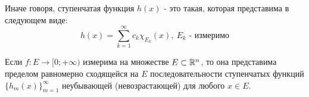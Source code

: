 \begin{note}
	Иначе говоря, ступенчатая функция $h(x)$ - это такая, которая представима в следующем виде:
	\[
		h(x) = \sum_{k = 1}^\infty c_k \chi_{E_k}(x),\ E_k \text{ - измеримо}
	\]
\end{note}

\begin{theorem}
	Если $f \colon E \to [0; +\infty)$ измерима на множестве $E \subset \mathbb{R}^n$, то она представима пределом равномерно сходящейся на $E$ последовательности ступенчатых функций $\{h_m(x)\}_{m = 1}^\infty$ неубывающей (невозрастающей) для любого $x \in E$.
\end{theorem}